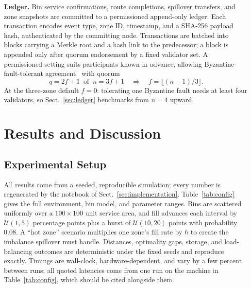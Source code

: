 \documentclass{llncs}
\begin{document}
\textbf{Ledger.} Bin service confirmations, route completions, spillover
transfers, and zone snapshots are committed to a permissioned append-only
ledger. Each transaction encodes event type, zone ID, timestamp, and a SHA-256
payload hash, authenticated by the committing node. Transactions are batched
into blocks carrying a Merkle root and a hash link to the predecessor; a block
is appended only after quorum endorsement by a fixed validator set. A
permissioned setting suits participants known in advance, allowing
Byzantine-fault-tolerant agreement~\cite{castro} with quorum
\begin{equation}
  q = 2f+1 \ \text{ of }\ n = 3f+1
  \quad\Longrightarrow\quad
  f = \lfloor (n-1)/3 \rfloor .
  \label{eq:quorum}
\end{equation}
At the three-zone default $f=0$: tolerating one Byzantine fault needs at least
four validators, so Sect.~\ref{sec:ledger} benchmarks from $n=4$ upward.

\section{Results and Discussion}
\label{sec:results}

\subsection{Experimental Setup}
\label{sec:setup}
All results come from a seeded, reproducible simulation; every number is
regenerated by the notebook of Sect.~\ref{sec:implementation}.
Table~\ref{tab:config} gives the full environment, bin model, and parameter
ranges. Bins are scattered uniformly over a $100\times100$ unit service area,
and fill advances each interval by $\mathcal{U}(1,5)$ percentage points plus a
burst of $\mathcal{U}(10,20)$ points with probability 0.08. A ``hot zone''
scenario multiplies one zone's fill rate by $h$ to create the imbalance
spillover must handle. Distances, optimality gaps, storage, and load-balancing
outcomes are deterministic under the fixed seeds and reproduce exactly.
Timings are wall-clock, hardware-dependent, and vary by a few percent between
runs; all quoted latencies come from one run on the machine in
Table~\ref{tab:config}, which should be cited alongside them.
\end{document}
